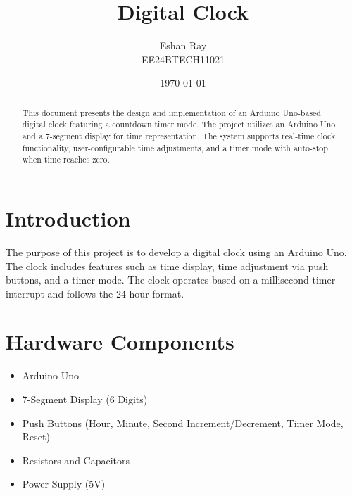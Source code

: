 \documentclass{article}
\title{Digital Clock}
\author{Eshan Ray\\ EE24BTECH11021}
\date{\today}
\begin{document}
\maketitle

\begin{abstract}
This document presents the design and implementation of an Arduino Uno-based digital clock featuring a countdown timer mode. The project utilizes an Arduino Uno and a 7-segment display for time representation. The system supports real-time clock functionality, user-configurable time adjustments, and a timer mode with auto-stop when time reaches zero.
\end{abstract}

\section{Introduction}
The purpose of this project is to develop a digital clock using an Arduino Uno. The clock includes features such as time display, time adjustment via push buttons, and a timer mode. The clock operates based on a millisecond timer interrupt and follows the 24-hour format.

\section{Hardware Components}
\begin{itemize}
\item Arduino Uno
\item 7-Segment Display (6 Digits)
\item Push Buttons (Hour, Minute, Second Increment/Decrement, Timer Mode, Reset)
\item Resistors and Capacitors
\item Power Supply (5V)
\end{itemize}
\end{document}
